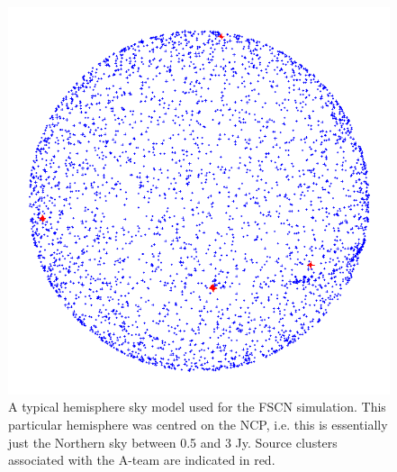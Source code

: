 \documentclass{aa}
\begin{document}
\begin{figure}
\centering \includegraphics[width=.7\columnwidth]{ncp-skymodel-transp}
\caption{\label{fig:ncp-skymodel}A typical hemisphere sky model used for the FSCN simulation. This particular hemisphere was centred on the NCP, i.e. this is essentially just the Northern sky between 0.5 and 3 Jy. Source clusters associated with the A-team are indicated in red.}
\end{figure}
\end{document}
